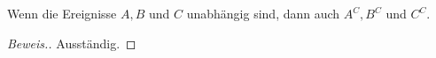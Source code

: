 \begin{lemma}
    Wenn die Ereignisse $A,B$ und $C$ unabhängig sind, dann auch $A^C,B^C$ und $C^C$.
\end{lemma}
\begin{proof}[Beweis.]
    Ausständig.
\end{proof}